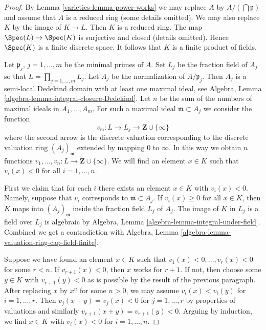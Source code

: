 \begin{proof}

By Lemma \ref{varieties-lemma-power-works} we may replace $A$ by
$A/(\bigcap \mathfrak p)$ and assume that $A$ is a reduced ring
(some details omitted).
We may also replace $K$ by the image of $K \to L$.
Then $K$ is a reduced ring. The map $\Spec(L) \to \Spec(K)$ is
surjective and closed (details omitted). Hence $\Spec(K)$ is a finite
discrete space. It follows that $K$ is a finite product of fields.

\medskip\noindent
Let $\mathfrak p_j$, $j = 1, \ldots, m$ be the minimal primes of $A$.
Set $L_j$ be the fraction field of $A_j$ so that
$L = \prod_{j = 1, \ldots, m} L_j$.
Let $A_j$ be the normalization of $A/\mathfrak p_j$. Then
$A_j$ is a semi-local Dedekind domain with at least
one maximal ideal, see
Algebra, Lemma \ref{algebra-lemma-integral-closure-Dedekind}.
Let $n$ be the sum of the numbers of maximal ideals
in $A_1, \ldots, A_m$. For such a maximal ideal $\mathfrak m \subset A_j$
we consider the function
$$
v_{\mathfrak m} : L \to L_j \to \mathbf{Z} \cup \{\infty\}
$$
where the second arrow is the discrete valuation corresponding
to the discrete valuation ring $(A_j)_{\mathfrak m}$ extended
by mapping $0$ to $\infty$. In this way we obtain $n$ functions
$v_1, \ldots, v_n : L \to \mathbf{Z} \cup \{\infty\}$.
We will find an element $x \in K$ such that $v_i(x) < 0$
for all $i = 1, \ldots, n$.

\medskip\noindent
First we claim that for each $i$ there exists an element $x \in K$
with $v_i(x) < 0$. Namely, suppose that $v_i$ corresponds to
$\mathfrak m \subset A_j$. If $v_i(x) \geq 0$ for all $x \in K$,
then $K$ maps into $(A_j)_{\mathfrak m}$ inside the fraction field
$L_j$ of $A_j$.
The image of $K$ in $L_j$ is a field over $L_j$ is
algebraic by Algebra, Lemma \ref{algebra-lemma-integral-under-field}.
Combined we get a contradiction with Algebra, Lemma
\ref{algebra-lemma-valuation-ring-cap-field-finite}.

\medskip\noindent
Suppose we have found an element $x \in K$ such that
$v_1(x) < 0, \ldots, v_r(x) < 0$ for some $r < n$. If $v_{r + 1}(x) < 0$,
then $x$ works for $r + 1$. If not, then choose some $y \in K$ with
$v_{r + 1}(y) < 0$ as is possible by the result of the previous
paragraph. After replacing $x$ by $x^n$ for some $n > 0$,
we may assume $v_i(x) < v_i(y)$ for $i = 1, \ldots, r$. Then
$v_j(x + y) = v_j(x) < 0$ for $j = 1, \ldots, r$ by properties
of valuations and similarly $v_{r + 1}(x + y) = v_{r + 1}(y) < 0$.
Arguing by induction, we find
$x \in K$ with $v_i(x) < 0$ for $i = 1, \ldots, n$.


\end{proof}
